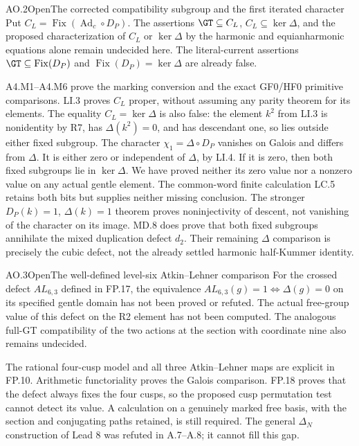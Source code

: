 \begin{statement}{AO.2}{Open}{The corrected compatibility subgroup and the first iterated character}
Put $C_L=\operatorname{Fix}(\operatorname{Ad}_c\circ D_P)$.
The assertions $\GT\subseteq C_L$, $C_L\subseteq\ker\Delta$,
and the proposed characterization of $C_L$ or $\ker\Delta$
by the harmonic and equianharmonic equations alone remain
undecided here. The literal-current assertions
$\GT\subseteq\operatorname{Fix}(D_P)$ and
$\operatorname{Fix}(D_P)=\ker\Delta$ are already false.
\end{statement}
A4.M1--A4.M6 prove the marking conversion and the exact
GF0/HF0 primitive comparisons. LI.3 proves $C_L$ proper,
without assuming any parity theorem for its elements.
The equality $C_L=\ker\Delta$ is also false: the element
$k^2$ from LI.3 is nonidentity by R7, has $\Delta(k^2)=0$,
and has descendant one, so lies outside either fixed subgroup.
The character $\chi_1=\Delta\circ D_P$ vanishes on Galois
and differs from $\Delta$. It is either zero or independent
of $\Delta$, by LI.4. If it is zero, then both fixed subgroups
lie in $\ker\Delta$. We have proved neither its zero value
nor a nonzero value on any actual gentle element.
The common-word finite calculation LC.5 retains both bits
but supplies neither missing conclusion. The stronger
$D_P(k)=1$, $\Delta(k)=1$ theorem proves noninjectivity of
descent, not vanishing of the character on its image.
MD.8 does prove that both fixed subgroups annihilate the mixed
duplication defect $d_2$. Their remaining $\Delta$ comparison
is precisely the cubic defect, not the already settled
harmonic half-Kummer identity.

\begin{statement}{AO.3}{Open}{The well-defined level-six Atkin--Lehner comparison}
For the crossed defect $AL_{6,3}$ defined in FP.17, the
equivalence $AL_{6,3}(g)=1\Longleftrightarrow\Delta(g)=0$
on its specified gentle domain has not been proved or refuted.
The actual free-group value of this defect on the R2 element
has not been computed. The analogous full-GT compatibility
of the two actions at the section with coordinate nine
also remains undecided.
\end{statement}
The rational four-cusp model and all three Atkin--Lehner maps
are explicit in FP.10. Arithmetic functoriality proves the
Galois comparison. FP.18 proves that the defect always fixes
the four cusps, so the proposed cusp permutation test cannot
detect its value. A calculation on a genuinely marked free
basis, with the section and conjugating paths retained,
is still required. The general $\Delta_N$ construction of
Lead 8 was refuted in A.7--A.8; it cannot fill this gap.
